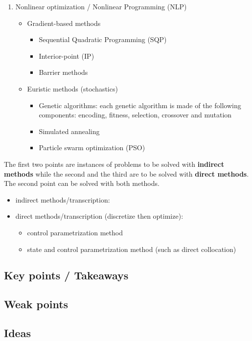 \begin{enumerate}
\item Nonlinear optimization / Nonlinear Programming (NLP)
\begin{itemize}
\item Gradient-based methods
\begin{itemize}
\item Sequential Quadratic Programming (SQP)
\item Interior-point (IP)
\item Barrier methods
\end{itemize}
\item Euristic methods (stochastics)
\begin{itemize}
\item Genetic algorithms: each genetic algorithm is made of the following components: encoding, fitness, selection, crossover and mutation
\item Simulated annealing
\item Particle swarm optimization (PSO)
\end{itemize}
\end{itemize}
\end{enumerate}
The first two points are instances of problems to be solved with \textbf{indirect methods} while the second and the third are to be solved with \textbf{direct methods}. The second point can be solved with both methods.\\
\begin{itemize}
\item indirect methods/transcription: 
\item direct methods/transcription (discretize then optimize):
\begin{itemize}
\item control parametrization method
\item state and control parametrization method (such as direct collocation)
\end{itemize}
\end{itemize}
\subsection*{Key points / Takeaways}
\subsection*{Weak points}
\subsection*{Ideas}
